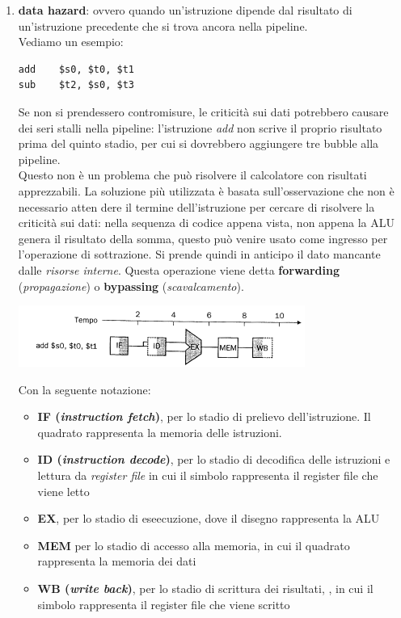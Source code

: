 \documentclass[a4paper,12pt, oneside]{book}
\begin{document}
\begin{enumerate}
  \item \textbf{data hazard}: ovvero quando un'istruzione dipende dal
  risultato di un'istruzione precedente che si trova ancora nella pipeline.\\
  Vediamo un esempio:
\begin{verbatim}
add    $s0, $t0, $t1
sub    $t2, $s0, $t3
\end{verbatim}
  Se non si prendessero contromisure, le criticità sui dati potrebbero causare dei seri
  stalli nella pipeline: l'istruzione \textit{add} non scrive il proprio risultato prima del quinto
  stadio, per cui si dovrebbero aggiungere tre bubble alla pipeline.\\
  Questo non è un problema che può risolvere il calcolatore con risultati apprezzabili. La soluzione più utilizzata è basata sull'osservazione che non è necessario atten dere il termine dell'istruzione per cercare di risolvere la criticità sui dati: nella sequenza di codice appena vista, non appena la ALU genera il risultato della somma, questo può venire usato come ingresso per l'operazione di sottrazione.
  Si prende quindi in anticipo il dato mancante dalle \textit{risorse interne}. Questa operazione viene detta \textbf{forwarding} (\textit{propagazione}) o \textbf{bypassing} (\textit{scavalcamento}).\\
  \begin{center}
    \includegraphics[scale = 0.7]{img/pro.png}
  \end{center}
  Con la seguente notazione:
  \begin{itemize}
    \item \textbf{IF (\textit{instruction fetch})}, per lo stadio di prelievo dell'istruzione. Il quadrato rappresenta la memoria delle istruzioni.
    \item \textbf{ID (\textit{instruction decode})}, per lo stadio di decodifica delle istruzioni e lettura da \textit{register file} in cui il simbolo rappresenta il register file che viene letto
    \item \textbf{EX}, per lo stadio di eseecuzione, dove il disegno rappresenta la ALU
    \item \textbf{MEM} per lo stadio di accesso alla memoria, in cui il quadrato rappresenta la memoria dei dati
    \item \textbf{WB (\textit{write back})}, per lo stadio di scrittura dei risultati, , in cui il simbolo rappresenta il register file che viene scritto

\end{itemize}
\end{enumerate}
\end{document}

